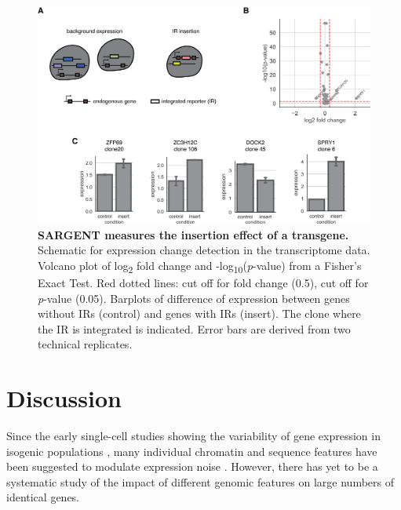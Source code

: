 \begin{figure}[t!]  
    \centering
    \includegraphics[width=\linewidth]{figures/cas/cas_figure6.png}
    \caption[SARGENT measures the insertion effect of a transgene.]{%
        \textbf{SARGENT measures the insertion effect of a transgene.}
        Schematic for expression change detection in the transcriptome data.
        Volcano plot of log\textsubscript{2} fold change and -log\textsubscript{10}(\textit{p}-value) from a Fisher’s Exact Test. Red dotted lines: cut off for fold change (0.5), cut off for \textit{p}-value (0.05).
        Barplots of difference of expression between genes without IRs (control) and genes with IRs (insert). The clone where the IR is integrated is indicated. Error bars are derived from two technical replicates.
    }
    \label{fig:cas_figure6}
\end{figure}

\section{Discussion}

Since the early single-cell studies showing the variability of gene expression in isogenic populations \cite{elowitzmb_swainps:StochasticGene2002}, many individual chromatin and sequence features have been suggested to modulate expression noise \cite{raja_vanoudenaardena:NatureNurture2008, raja_tyagis:StochasticMRNA2006,bonnyar_el-samadh:OrthogonalControl2021, desairv_weinbergerls:DNARepair2021}. However, there has yet to be a systematic study of the impact of different genomic features on large numbers of identical genes. 
   
